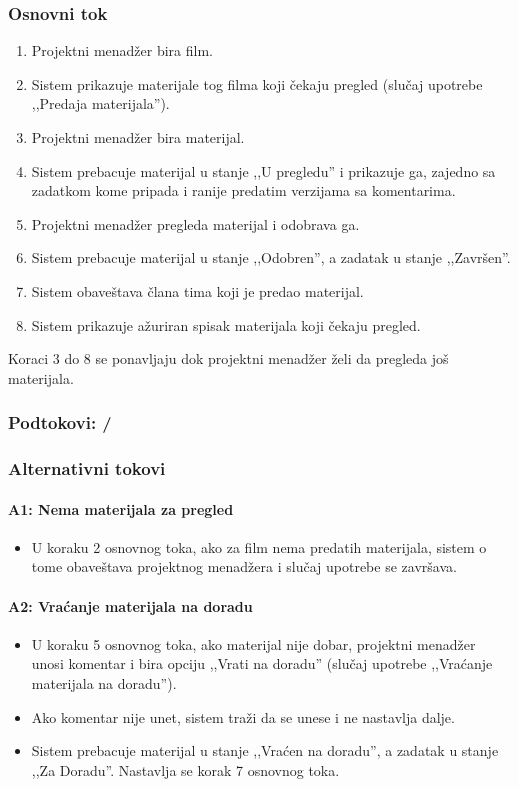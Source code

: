 \subsubsection*{Osnovni tok}
\begin{enumerate}
    \item Projektni menadžer bira film.
    \item Sistem prikazuje materijale tog filma koji čekaju pregled (slučaj upotrebe ,,Predaja materijala'').
    \item Projektni menadžer bira materijal.
    \item Sistem prebacuje materijal u stanje ,,U pregledu'' i prikazuje ga, zajedno sa zadatkom kome pripada i ranije predatim verzijama sa komentarima.
    \item Projektni menadžer pregleda materijal i odobrava ga.
    \item Sistem prebacuje materijal u stanje ,,Odobren'', a zadatak u stanje ,,Završen''.
    \item Sistem obaveštava člana tima koji je predao materijal.
    \item Sistem prikazuje ažuriran spisak materijala koji čekaju pregled.
\end{enumerate}

Koraci 3 do 8 se ponavljaju dok projektni menadžer želi da pregleda još materijala.

\subsubsection*{Podtokovi: /}

\subsubsection*{Alternativni tokovi}

\paragraph*{A1: Nema materijala za pregled}
\begin{itemize}
    \item U koraku 2 osnovnog toka, ako za film nema predatih materijala, sistem o tome obaveštava projektnog menadžera i slučaj upotrebe se završava.
\end{itemize}

\paragraph*{A2: Vraćanje materijala na doradu}
\begin{itemize}
    \item U koraku 5 osnovnog toka, ako materijal nije dobar, projektni menadžer unosi komentar i bira opciju ,,Vrati na doradu'' (slučaj upotrebe ,,Vraćanje materijala na doradu'').
    \item Ako komentar nije unet, sistem traži da se unese i ne nastavlja dalje.
    \item Sistem prebacuje materijal u stanje ,,Vraćen na doradu'', a zadatak u stanje ,,Za Doradu''. Nastavlja se korak 7 osnovnog toka.
\end{itemize}

